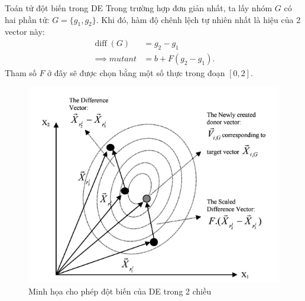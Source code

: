 \begin{frame}{Toán tử đột biến trong DE}
  Trong trường hợp đơn giản nhất, ta lấy nhóm \( G \) có hai phần tử: \( G =
  \{g_{1}, g_{2}\}   \). Khi đó, hàm độ chênh lệch tự nhiên nhất là hiệu của 2
  vector này:
  \begin{align*}
    \operatorname{diff}(G) &=  g_{2} - g_{1}\\ 
    \implies mutant &= b + F(g_{2} - g_{1})
  .\end{align*}
  Tham số \( F \) ở đây sẽ được chọn bằng một số thực trong đoạn \( [0, 2] \).
  \begin{figure}
    \centering
    \includegraphics[height=0.4\textheight]{res/de2d.png}
    \caption{Minh họa cho phép đột biến của DE trong 2 chiều}
  \end{figure}
\end{frame}

